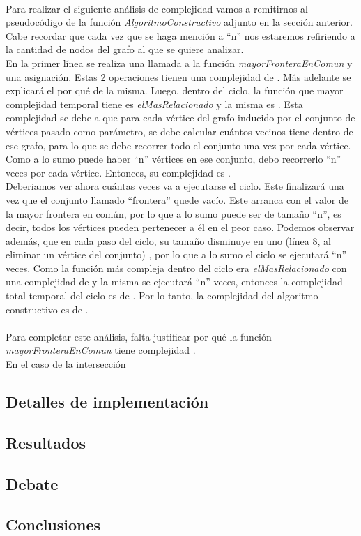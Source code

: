\paragraph{}
Para realizar el siguiente análisis de complejidad vamos a remitirnos al pseudocódigo de la función \textit{AlgoritmoConstructivo} adjunto en la sección anterior. Cabe recordar que cada vez que se haga mención a ``n'' nos estaremos refiriendo a la cantidad de nodos del grafo al que se quiere analizar.\\
En la primer línea se realiza una llamada a la función \textit{mayorFronteraEnComun} y una asignación. Estas 2 operaciones tienen una complejidad de . Más adelante se explicará el por qué de la misma. Luego, dentro del ciclo, la función que mayor complejidad temporal tiene es \textit{elMasRelacionado} y la misma es . Esta complejidad se debe a que para cada vértice del grafo inducido por el conjunto de vértices pasado como parámetro, se debe calcular cuántos vecinos tiene dentro de ese grafo, para lo que se debe recorrer todo el conjunto una vez por cada vértice. Como a lo sumo puede haber ``n'' vértices en ese conjunto, debo recorrerlo ``n'' veces por cada vértice. Entonces, su complejidad es .\\
Deberiamos ver ahora cuántas veces va a ejecutarse el ciclo. Este finalizará una vez que el conjunto llamado ``frontera'' quede vacío. Este arranca con el valor de la mayor frontera en común, por lo que a lo sumo puede ser de tamaño ``n'', es decir, todos los vértices pueden pertenecer a él en el peor caso. Podemos observar además, que en cada paso del ciclo, su tamaño disminuye en uno (línea 8, al eliminar un vértice del conjunto) , por lo que a lo sumo el ciclo se ejecutará ``n'' veces. Como la función más compleja dentro del ciclo era \textit{elMasRelacionado} con una complejidad de  y la misma se ejecutará ``n'' veces, entonces la complejidad total temporal del ciclo es de . Por lo tanto, la complejidad del algoritmo constructivo es de .

\paragraph{}
Para completar este análisis, falta justificar por qué la función \textit{mayorFronteraEnComun} tiene complejidad .\\
En el caso de la intersección 


\subsection{Detalles de implementación}
\subsection{Resultados}
\subsection{Debate}
\subsection{Conclusiones}
